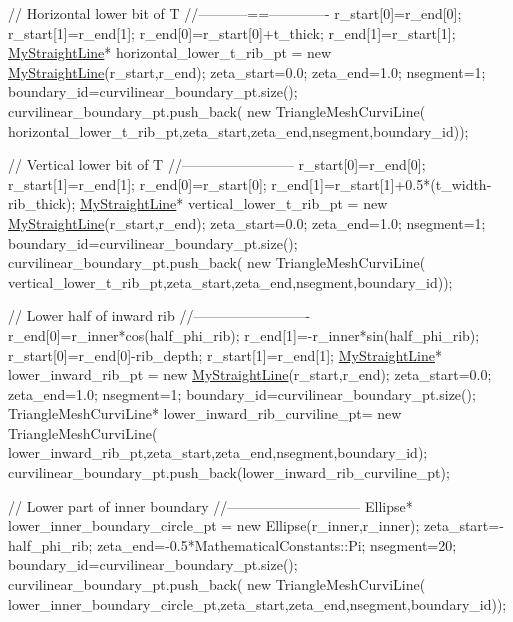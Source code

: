 \begin{DoxyCodeInclude}
 \textcolor{comment}{// Horizontal lower bit of T}
 \textcolor{comment}{//-----------==-------------}
 r\_start[0]=r\_end[0];
 r\_start[1]=r\_end[1];
 r\_end[0]=r\_start[0]+t\_thick;
 r\_end[1]=r\_start[1];
 \hyperlink{classMyStraightLine}{MyStraightLine}* horizontal\_lower\_t\_rib\_pt = \textcolor{keyword}{new} \hyperlink{classMyStraightLine}{MyStraightLine}(r\_start,r\_end);
 zeta\_start=0.0;
 zeta\_end=1.0;
 nsegment=1;
 boundary\_id=curvilinear\_boundary\_pt.size();
 curvilinear\_boundary\_pt.push\_back(
  \textcolor{keyword}{new} TriangleMeshCurviLine(
   horizontal\_lower\_t\_rib\_pt,zeta\_start,zeta\_end,nsegment,boundary\_id));


 \textcolor{comment}{// Vertical lower bit of T}
 \textcolor{comment}{//------------------------}
 r\_start[0]=r\_end[0];
 r\_start[1]=r\_end[1];
 r\_end[0]=r\_start[0];
 r\_end[1]=r\_start[1]+0.5*(t\_width-rib\_thick);
 \hyperlink{classMyStraightLine}{MyStraightLine}* vertical\_lower\_t\_rib\_pt = \textcolor{keyword}{new} \hyperlink{classMyStraightLine}{MyStraightLine}(r\_start,r\_end);
 zeta\_start=0.0;
 zeta\_end=1.0;
 nsegment=1;
 boundary\_id=curvilinear\_boundary\_pt.size();
 curvilinear\_boundary\_pt.push\_back(
  \textcolor{keyword}{new} TriangleMeshCurviLine(
   vertical\_lower\_t\_rib\_pt,zeta\_start,zeta\_end,nsegment,boundary\_id));


 \textcolor{comment}{// Lower half of inward rib}
 \textcolor{comment}{//-------------------------}
 r\_end[0]=r\_inner*cos(half\_phi\_rib);
 r\_end[1]=-r\_inner*sin(half\_phi\_rib);
 r\_start[0]=r\_end[0]-rib\_depth;
 r\_start[1]=r\_end[1];
 \hyperlink{classMyStraightLine}{MyStraightLine}* lower\_inward\_rib\_pt = \textcolor{keyword}{new} \hyperlink{classMyStraightLine}{MyStraightLine}(r\_start,r\_end);
 zeta\_start=0.0;
 zeta\_end=1.0;
 nsegment=1;
 boundary\_id=curvilinear\_boundary\_pt.size();
 TriangleMeshCurviLine* lower\_inward\_rib\_curviline\_pt=
  \textcolor{keyword}{new} TriangleMeshCurviLine(
   lower\_inward\_rib\_pt,zeta\_start,zeta\_end,nsegment,boundary\_id);
 curvilinear\_boundary\_pt.push\_back(lower\_inward\_rib\_curviline\_pt);


 \textcolor{comment}{// Lower part of inner boundary}
 \textcolor{comment}{//-----------------------------}
 Ellipse* lower\_inner\_boundary\_circle\_pt = \textcolor{keyword}{new} Ellipse(r\_inner,r\_inner);
 zeta\_start=-half\_phi\_rib;
 zeta\_end=-0.5*MathematicalConstants::Pi;
 nsegment=20;
 boundary\_id=curvilinear\_boundary\_pt.size();
 curvilinear\_boundary\_pt.push\_back(
  \textcolor{keyword}{new} TriangleMeshCurviLine(
   lower\_inner\_boundary\_circle\_pt,zeta\_start,zeta\_end,nsegment,boundary\_id));
 

\end{DoxyCodeInclude}
